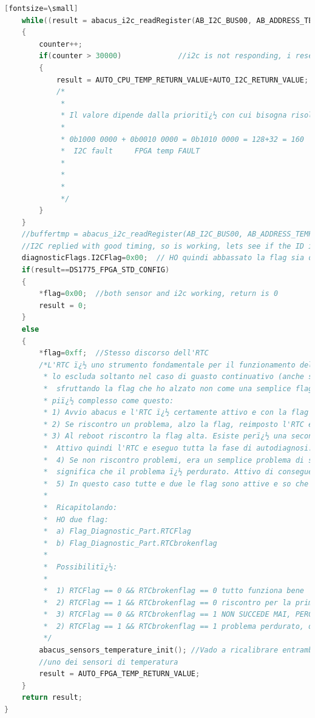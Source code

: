 \documentclass[LaM,binding=0.6cm]{../sapthesis}
\begin{document}
\begin{lstlisting}[language=c][fontsize=\small]
    while((result = abacus_i2c_readRegister(AB_I2C_BUS00, AB_ADDRESS_TEMPFPGA, DS1775CONFIGREG))==0x00)
    {
        counter++;
        if(counter > 30000)             //i2c is not responding, i reset, so i set both acc and i2c not working to be sure
        {
            result = AUTO_CPU_TEMP_RETURN_VALUE+AUTO_I2C_RETURN_VALUE;
            /*
             *
             * Il valore dipende dalla prioritï¿½ con cui bisogna risolvere il problema: questo identifica che sia il bus IC che l'accelerometro sono non funzionanti:
             *
             * 0b1000 0000 + 0b0010 0000 = 0b1010 0000 = 128+32 = 160
             *  I2C fault     FPGA temp FAULT
             *
             *
             *
             */
        }
    }
    //buffertmp = abacus_i2c_readRegister(AB_I2C_BUS00, AB_ADDRESS_TEMPFPGA, DS1775CONFIGREG);
    //I2C replied with good timing, so is working, lets see if the ID is correct
    diagnosticFlags.I2CFlag=0x00;  // HO quindi abbassato la flag sia del sensore che del bus
    if(result==DS1775_FPGA_STD_CONFIG)
    {
        *flag=0x00;  //both sensor and i2c working, return is 0
        result = 0;
    }
    else
    {
        *flag=0xff;  //Stesso discorso dell'RTC
        /*L'RTC ï¿½ uno strumento fondamentale per il funzionamento del sistema. Bisogna creare un sistema che
         * lo escluda soltanto nel caso di guasto continuativo (anche se lo resetto). Questo potrebbe essere fatto
         *  sfruttando la flag che ho alzato non come una semplice flag che esclude direttamente al reset, ma con un sistema
         * piï¿½ complesso come questo:
         * 1) Avvio abacus e l'RTC ï¿½ certamente attivo e con la flag abbassata (a 0x0 )
         * 2) Se riscontro un problema, alzo la flag, reimposto l'RTC e rebootto.
         * 3) Al reboot riscontro la flag alta. Esiste perï¿½ una seconda flag che tiene conto se il problema ï¿½ perdurato e questa ï¿½ ancora bassa.
         *  Attivo quindi l'RTC e eseguo tutta la fase di autodiagnosi.
         *  4) Se non riscontro problemi, era un semplice problema di settaggi. Se riscontro nuovamente un problema (bus bloccato, config reg diverso)
         *  significa che il problema ï¿½ perdurato. Attivo di conseguenza la seconda flag (Sensor_broken_flag) e rebootto.
         *  5) In questo caso tutte e due le flag sono attive e so che non devo attivare l'RTC
         *
         *  Ricapitolando:
         *  HO due flag:
         *  a) Flag_Diagnostic_Part.RTCFlag
         *  b) Flag_Diagnostic_Part.RTCbrokenflag
         *
         *  Possibilitï¿½:
         *
         *  1) RTCFlag == 0 && RTCbrokenflag == 0 tutto funziona bene
         *  2) RTCFlag == 1 && RTCbrokenflag == 0 riscontro per la prima volta un problema
         *  3) RTCFlag == 0 && RTCbrokenflag == 1 NON SUCCEDE MAI, PERCHï¿½ IMPONGO CHE LA BROKEN FLAG SIA MODIFICABILE DOPO LA RTC FLAG
         *  2) RTCFlag == 1 && RTCbrokenflag == 1 problema perdurato, devo disattivare l'RTC
         */
        abacus_sensors_temperature_init(); //Vado a ricalibrare entrambi i sensori di temperatura. Potrei anche generare una funzione che calibri soltanto
        //uno dei sensori di temperatura
        result = AUTO_FPGA_TEMP_RETURN_VALUE;
    }
    return result;
}




\end{lstlisting}
\end{document}
